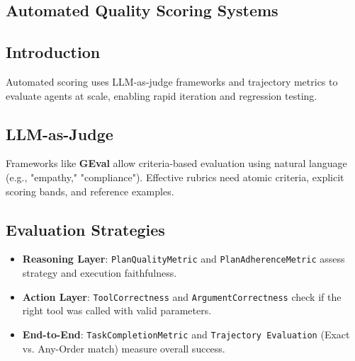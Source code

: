 \begin{TNtwocol}
\section{Automated Quality Scoring Systems}
\subsection{Introduction}
Automated scoring uses LLM-as-judge frameworks and trajectory metrics to evaluate agents at scale, enabling rapid iteration and regression testing.

\subsection{LLM-as-Judge}
Frameworks like \textbf{GEval} allow criteria-based evaluation using natural language (e.g., "empathy," "compliance"). Effective rubrics need atomic criteria, explicit scoring bands, and reference examples.

\subsection{Evaluation Strategies}
\begin{itemize}
    \item \textbf{Reasoning Layer}: \texttt{PlanQualityMetric} and \texttt{PlanAdherenceMetric} assess strategy and execution faithfulness.
    \item \textbf{Action Layer}: \texttt{ToolCorrectness} and \texttt{ArgumentCorrectness} check if the right tool was called with valid parameters.
    \item \textbf{End-to-End}: \texttt{TaskCompletionMetric} and \texttt{Trajectory Evaluation} (Exact vs. Any-Order match) measure overall success.
\end{itemize}
\end{TNtwocol}
